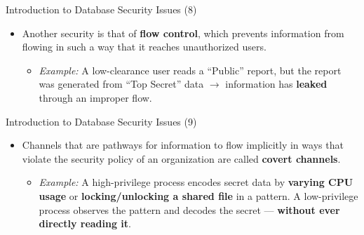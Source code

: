 \begin{frame}{Introduction to Database Security Issues (8)}
    \Large
    
    \begin{itemize}
        \vspace{-0.5cm}
        \item Another security is that of \textbf{flow control}, which prevents information from flowing in such a way that it reaches unauthorized users.
        
        \vspace{0.4cm}
        
        \begin{itemize}
            \large
            \setlength{\itemsep}{0.2cm}
            \item \textit{Example:} A low-clearance user reads a ``Public'' report, but the report was generated from ``Top Secret'' data $\rightarrow$ information has \textbf{leaked} through an improper flow.
        \end{itemize}
        
    \end{itemize}
\end{frame}


\begin{frame}{Introduction to Database Security Issues (9)}
    \Large
    
    \begin{itemize}
        \vspace{-0.5cm}
        \item Channels that are pathways for information to flow implicitly in ways that violate the security policy of an organization are called \textbf{covert channels}.
        
        \vspace{0.4cm}
        
        \begin{itemize}
            \large
            \setlength{\itemsep}{0.2cm}
            \item \textit{Example:} A high-privilege process encodes secret data by \textbf{varying CPU usage} or \textbf{locking/unlocking a shared file} in a pattern. A low-privilege process observes the pattern and decodes the secret --- \textbf{without ever directly reading it}.
        \end{itemize}
        
    \end{itemize}
\end{frame}


